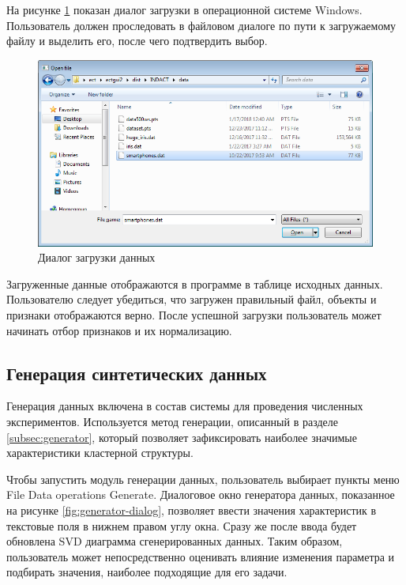 \documentclass[12pt]{diploma}
\begin{document}
	На рисунке \ref{fig:load-dialog} показан диалог загрузки в операционной системе Windows. Пользователь должен проследовать в файловом диалоге по пути к загружаемому файлу и выделить его, после чего подтвердить выбор.

	\begin{figure}[h!]
		\centering
		\includegraphics[width=0.8\linewidth]{img/instruction/open-smartphones}
		\caption{Диалог загрузки данных}
		\label{fig:load-dialog}
	\end{figure}
	
	Загруженные данные отображаются в программе в таблице исходных данных. Пользователю следует убедиться, что загружен правильный файл, объекты и признаки отображаются верно. После успешной загрузки пользователь может начинать отбор признаков и их нормализацию.
	
	\subsection{Генерация синтетических данных}

	Генерация данных включена в состав системы для проведения численных экспериментов. Используется метод генерации, описанный в разделе \ref{subsec:generator}, который позволяет зафиксировать наиболее значимые характеристики кластерной структуры.
	
	Чтобы запустить модуль генерации данных, пользователь выбирает пункты меню File \textrightarrow Data operations  \textrightarrow Generate. Диалоговое окно генератора данных, показанное на рисунке \ref{fig:generator-dialog}, позволяет ввести значения характеристик в текстовые поля в нижнем правом углу окна. Сразу же после ввода будет обновлена SVD диаграмма сгенерированных данных. Таким образом, пользователь может непосредственно оценивать влияние изменения параметра и подбирать  значения, наиболее подходящие для его задачи.
			
\end{document}
